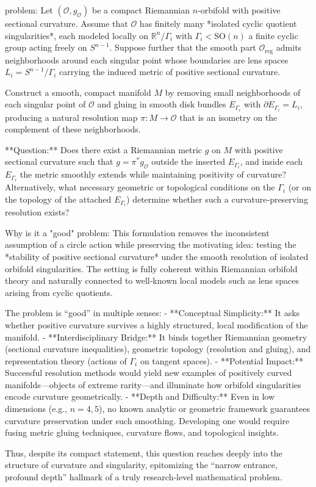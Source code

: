 problem:  
Let $(\mathcal{O}, g_{\mathcal{O}})$ be a compact Riemannian $n$‑orbifold with positive sectional curvature. Assume that $\mathcal{O}$ has finitely many *isolated cyclic quotient singularities*, each modeled locally on $\mathbb{R}^n / \Gamma_i$ with $\Gamma_i < \mathrm{SO}(n)$ a finite cyclic group acting freely on $S^{n-1}$. Suppose further that the smooth part $\mathcal{O}_{\mathrm{reg}}$ admits neighborhoods around each singular point whose boundaries are lens spaces $L_i = S^{n-1} / \Gamma_i$ carrying the induced metric of positive sectional curvature.  

Construct a smooth, compact manifold $M$ by removing small neighborhoods of each singular point of $\mathcal{O}$ and gluing in smooth disk bundles $E_{\Gamma_i}$ with $\partial E_{\Gamma_i} = L_i$, producing a natural resolution map $\pi : M \to \mathcal{O}$ that is an isometry on the complement of these neighborhoods.  

**Question:**  
Does there exist a Riemannian metric $g$ on $M$ with positive sectional curvature such that $g = \pi^* g_{\mathcal{O}}$ outside the inserted $E_{\Gamma_i}$, and inside each $E_{\Gamma_i}$ the metric smoothly extends while maintaining positivity of curvature?  
Alternatively, what necessary geometric or topological conditions on the $\Gamma_i$ (or on the topology of the attached $E_{\Gamma_i}$) determine whether such a curvature‑preserving resolution exists?

Why is it a "good" problem:  
This formulation removes the inconsistent assumption of a circle action while preserving the motivating idea: testing the *stability of positive sectional curvature* under the smooth resolution of isolated orbifold singularities. The setting is fully coherent within Riemannian orbifold theory and naturally connected to well‑known local models such as lens spaces arising from cyclic quotients.  

The problem is “good” in multiple senses:  
- **Conceptual Simplicity:** It asks whether positive curvature survives a highly structured, local modification of the manifold.  
- **Interdisciplinary Bridge:** It binds together Riemannian geometry (sectional curvature inequalities), geometric topology (resolution and gluing), and representation theory (actions of $\Gamma_i$ on tangent spaces).  
- **Potential Impact:** Successful resolution methods would yield new examples of positively curved manifolds—objects of extreme rarity—and illuminate how orbifold singularities encode curvature geometrically.  
- **Depth and Difficulty:** Even in low dimensions (e.g., $n=4,5$), no known analytic or geometric framework guarantees curvature preservation under such smoothing. Developing one would require fusing metric gluing techniques, curvature flows, and topological insights.  

Thus, despite its compact statement, this question reaches deeply into the structure of curvature and singularity, epitomizing the “narrow entrance, profound depth” hallmark of a truly research‑level mathematical problem.